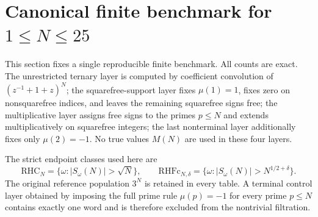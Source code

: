 \documentclass[11pt]{article}
\newcommand{\RHC}{\mathrm{RHC}}
\newcommand{\RHFc}{\mathrm{RHFc}}
\begin{document}
\section{Canonical finite benchmark for $1\le N\le 25$}

This section fixes a single reproducible finite benchmark. All counts are exact. The unrestricted ternary layer is computed by coefficient convolution of $(z^{-1}+1+z)^N$; the squarefree-support layer fixes $\mu(1)=1$, fixes zero on nonsquarefree indices, and leaves the remaining squarefree signs free; the multiplicative layer assigns free signs to the primes $p\le N$ and extends multiplicatively on squarefree integers; the last nonterminal layer additionally fixes only $\mu(2)=-1$. No true values $M(N)$ are used in these four layers.

The strict endpoint classes used here are
\[
 \RHC_N=\{\omega:|S_\omega(N)|>\sqrt N\},
 \qquad
 \RHFc_{N,\delta}=\{\omega:|S_\omega(N)|>N^{1/2+\delta}\}.
\]
The original reference population $3^N$ is retained in every table. A terminal control layer obtained by imposing the full prime rule $\mu(p)=-1$ for every prime $p\le N$ contains exactly one word and is therefore excluded from the nontrivial filtration.
\end{document}
